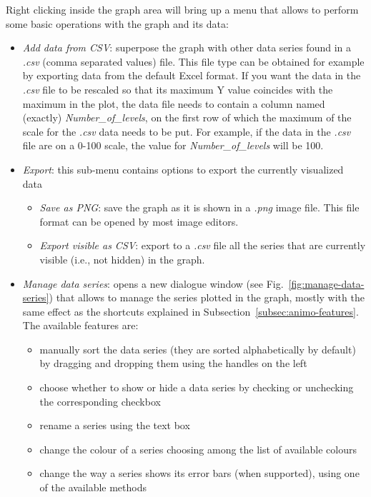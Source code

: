 \documentclass{article}
\begin{document}
Right clicking inside the graph area will bring up a menu that allows to perform some basic operations with the graph
and its data:
\begin{itemize}
  \item \emph{Add data from CSV}: \label{csv-import-format}superpose the graph with other data series found in a \emph{.csv} (comma separated values) file. This file type can be
obtained for example by exporting data from the default Excel format. If you want the data in the \emph{.csv} file to be rescaled so
that its maximum Y value coincides with the maximum in the plot, the data file needs to contain a column named (exactly)
\emph{Number\_{}of\_{}levels}, on the first row of which the maximum of the scale for the \emph{.csv} data needs to be put. For example,
if the data in the \emph{.csv} file are on a 0-100 scale, the value for \emph{Number\_{}of\_{}levels} will be 100.
  \item \emph{Export}: this sub-menu contains options to export the currently visualized data
    \begin{itemize}
	\item \emph{Save as PNG}: save the graph as it is shown in a \emph{.png} image file. This file format can be opened by most
      image editors.
	\item \emph{Export visible as CSV}: export to a \emph{.csv} file all the series that are currently visible (i.e., not hidden)
      in the graph.
    \end{itemize}
  \item \emph{Manage data series}: opens a new dialogue window (see Fig.~\ref{fig:manage-data-series})
	that allows to manage the series plotted in the
	graph, mostly with the same effect as the shortcuts explained in Subsection~\ref{subsec:animo-features}. The available features are:
	  \begin{itemize}
	    \item manually sort the data series (they are sorted alphabetically by default) by dragging and dropping them using the handles on the left
	    \item choose whether to show or hide a data series by checking or unchecking the corresponding checkbox
	    \item rename a series using the text box
	    \item change the colour of a series choosing among the list of available colours
	    \item change the way a series shows its error bars (when supported), using one of the available methods

\end{itemize}
\end{itemize}
\end{document}

